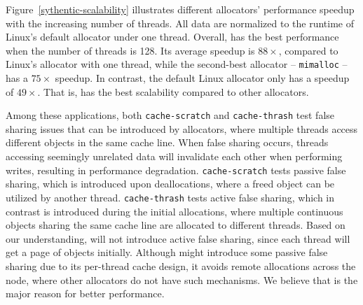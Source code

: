 Figure~\ref{sythentic-scalability} illustrates different allocators' performance speedup with the increasing number of threads. All data are normalized to the runtime of Linux's default allocator under one thread. Overall, \NM{} has the best performance when the number of threads is 128. Its average speedup is $88\times$, compared to Linux's allocator with one thread, while the second-best allocator -- \texttt{mimalloc} -- has a $75\times$ speedup. In contrast, the default Linux allocator only has a speedup of $49\times$. That is, \NM{} has the best scalability compared to other allocators.

Among these applications, both \texttt{cache-scratch} and \texttt{cache-thrash} test false sharing issues that can be introduced by allocators, where multiple threads access different objects in the same cache line. When false sharing occurs, threads accessing seemingly unrelated data will invalidate each other when performing writes, resulting in performance degradation.
\texttt{cache-scratch} tests passive false sharing, which is introduced upon deallocations, where a freed object can be utilized by another thread. \texttt{cache-thrash} tests active false sharing, which in contrast is introduced during the initial allocations, where multiple continuous objects sharing the same cache line are allocated to different threads.
Based on our understanding, \NM{} will not introduce active false sharing, since each thread will get a page of objects initially. Although \NM{} might introduce some passive false sharing due to its per-thread cache design, it avoids remote allocations across the node, where other allocators do not have such mechanisms. We believe that is the major reason for \NM{} better performance.


